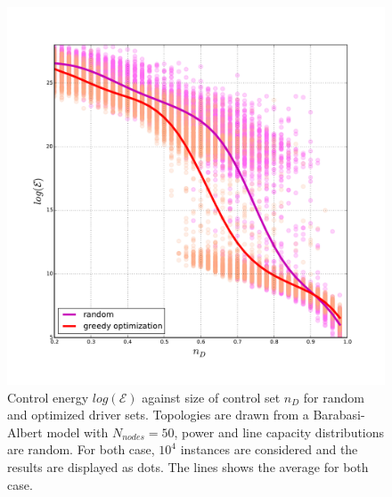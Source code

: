 \documentclass[conference]{IEEEtran}
\begin{document}

\begin{figure}
\includegraphics[scale=.35]{./figure_3/figure_3}
\caption{Control energy $log(\mathcal{E})$ against size of control set $n_D$ for random and optimized driver sets. Topologies are drawn from a Barabasi-Albert model with $ N_{nodes} = 50 $, power and line capacity distributions are random. For both case, $10^4$ instances are considered and the results are displayed as dots. The lines shows the average for both case. }
\label{fig:densities}
\end{figure}
\end{document}
